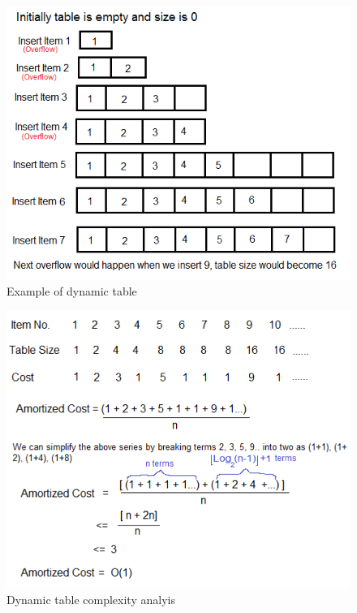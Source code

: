 \begin{figure}[H]
\centering
\includegraphics[scale=0.6]{figures/MDS2.png}
\caption{Example of dynamic table}
    \label{fig:example_figure}
\end{figure}

\begin{figure}[H]
\centering
\includegraphics[scale=0.6]{figures/MDS3.png}
\caption{Dynamic table complexity analyis}
    \label{fig:example_figure}
\end{figure}

